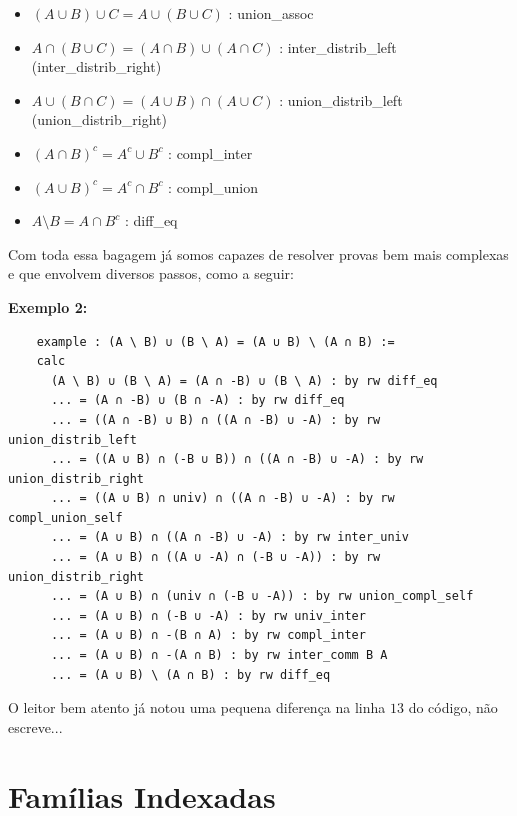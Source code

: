 \begin{itemize}
    \item $(A \cup B) \cup C = A \cup (B \cup C)$ : {\selectfont union\_assoc}
    \item $A \cap (B \cup C) = (A \cap B) \cup (A \cap C)$ : {\selectfont inter\_distrib\_left} ({\selectfont inter\_distrib\_right})
    \item $A \cup (B \cap C) = (A \cup B) \cap (A \cup C)$ : {\selectfont union\_distrib\_left} ({\selectfont union\_distrib\_right})
    \item $(A \cap B)^c = A^c \cup B^c$ : {\selectfont compl\_inter}
    \item $(A \cup B)^c = A^c \cap B^c$ : {\selectfont compl\_union}
    \item $A \setminus B = A \cap B^c$ : {\selectfont diff\_eq}
  \end{itemize}

  Com toda essa bagagem já somos capazes de resolver provas bem mais complexas e que envolvem diversos passos, como a seguir:

  \textbf{Exemplo 2:}
  \begin{lstlisting}
    example : (A \ B) ∪ (B \ A) = (A ∪ B) \ (A ∩ B) :=
    calc
      (A \ B) ∪ (B \ A) = (A ∩ -B) ∪ (B \ A) : by rw diff_eq
      ... = (A ∩ -B) ∪ (B ∩ -A) : by rw diff_eq
      ... = ((A ∩ -B) ∪ B) ∩ ((A ∩ -B) ∪ -A) : by rw union_distrib_left
      ... = ((A ∪ B) ∩ (-B ∪ B)) ∩ ((A ∩ -B) ∪ -A) : by rw union_distrib_right
      ... = ((A ∪ B) ∩ univ) ∩ ((A ∩ -B) ∪ -A) : by rw compl_union_self
      ... = (A ∪ B) ∩ ((A ∩ -B) ∪ -A) : by rw inter_univ
      ... = (A ∪ B) ∩ ((A ∪ -A) ∩ (-B ∪ -A)) : by rw union_distrib_right
      ... = (A ∪ B) ∩ (univ ∩ (-B ∪ -A)) : by rw union_compl_self
      ... = (A ∪ B) ∩ (-B ∪ -A) : by rw univ_inter
      ... = (A ∪ B) ∩ -(B ∩ A) : by rw compl_inter
      ... = (A ∪ B) ∩ -(A ∩ B) : by rw inter_comm B A
      ... = (A ∪ B) \ (A ∩ B) : by rw diff_eq \end{lstlisting}

  O leitor bem atento já notou uma pequena diferença na linha $13$ do código, não escreve...

\section{Famílias Indexadas}

